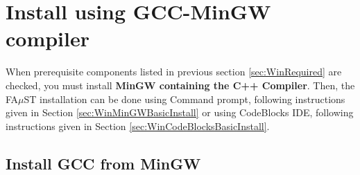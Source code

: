 \section{Install using GCC-MinGW compiler}\label{sec:WinInstallMinGW}

When prerequisite components listed in previous section \ref{sec:WinRequired} are checked, you must install \textbf{MinGW containing the C++ Compiler}. 
Then, the FA$\mu$ST installation can be done using Command prompt, following instructions given in Section \ref{sec:WinMinGWBasicInstall} or using CodeBlocks IDE, following instructions given in Section \ref{sec:WinCodeBlocksBasicInstall}. 


\subsection{Install GCC from MinGW}
\label{sec:WinInstallCompilerMinGW}

